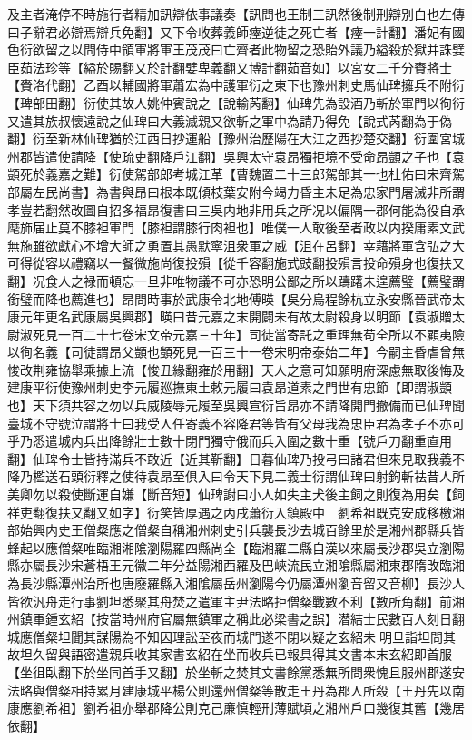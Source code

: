 及主者淹停不時施行者精加訊辯依事議奏【訊問也王制三訊然後制刑辯别白也左傳曰子辭君必辯焉辯兵免翻】又下令收葬義師瘞逆徒之死亡者【瘞一計翻】潘妃有國色衍欲留之以問侍中領軍將軍王茂茂曰亡齊者此物留之恐貽外議乃縊殺於獄并誅嬖臣茹法珍等【縊於賜翻又於計翻嬖卑義翻又博計翻茹音如】以宮女二千分賚將士【賚洛代翻】乙酉以輔國將軍蕭宏為中護軍衍之東下也豫州刺史馬仙琕擁兵不附衍【琕部田翻】衍使其故人姚仲賓說之【說輸芮翻】仙琕先為設酒乃斬於軍門以徇衍又遣其族叔懷遠說之仙琕曰大義滅親又欲斬之軍中為請乃得免【說式芮翻為于偽翻】衍至新林仙琕猶於江西日抄運船【豫州治歷陽在大江之西抄楚交翻】衍圍宮城州郡皆遣使請降【使疏吏翻降戶江翻】吳興太守袁昂獨拒境不受命昂顗之子也【袁顗死於義嘉之難】衍使駕部郎考城江革【曹魏置二十三郎駕部其一也杜佑曰宋齊駕部屬左民尚書】為書與昂曰根本既傾枝葉安附今竭力昏主未足為忠家門屠滅非所謂孝豈若翻然改圖自招多福昂復書曰三吳内地非用兵之所况以偏隅一郡何能為役自承麾斾届止莫不膝袒軍門【膝袒謂膝行肉袒也】唯僕一人敢後至者政以内揆庸素文武無施雖欲獻心不增大師之勇置其愚默寧沮衆軍之威【沮在呂翻】幸藉將軍含弘之大可得從容以禮竊以一餐微施尚復投殞【從千容翻施式豉翻投殞言投命殞身也復扶又翻】况食人之禄而頓忘一旦非唯物議不可亦恐明公鄙之所以躊躇未遑薦璧【薦璧謂銜璧而降也薦進也】昂問時事於武康令北地傅暎【吳分烏程餘杭立永安縣晉武帝太康元年更名武康屬吳興郡】暎曰昔元嘉之末開闢未有故太尉殺身以明節【袁淑贈太尉淑死見一百二十七卷宋文帝元嘉三十年】司徒當寄託之重理無苟全所以不顧夷險以徇名義【司徒謂昂父顗也顗死見一百三十一卷宋明帝泰始二年】今嗣主昏虐曾無悛改荆雍協舉乘據上流【悛丑緣翻雍於用翻】天人之意可知願明府深慮無取後悔及建康平衍使豫州刺史李元履廵撫東土敕元履曰袁昂道素之門世有忠節【即謂淑顗也】天下須共容之勿以兵威陵辱元履至吳興宣衍旨昂亦不請降開門撤備而已仙琕聞臺城不守號泣謂將士曰我受人任寄義不容降君等皆有父母我為忠臣君為孝子不亦可乎乃悉遣城内兵出降餘壯士數十閉門獨守俄而兵入圍之數十重【號戶刀翻重直用翻】仙琕令士皆持滿兵不敢近【近其靳翻】日暮仙琕乃投弓曰諸君但來見取我義不降乃檻送石頭衍釋之使待袁昂至俱入曰令天下見二義士衍謂仙琕曰射鉤斬袪昔人所美卿勿以殺使斷運自嫌【斷音短】仙琕謝曰小人如失主犬後主飼之則復為用矣【飼祥吏翻復扶又翻又如字】衍笑皆厚遇之丙戌蕭衍入鎮殿中　劉希祖既克安成移檄湘部始興内史王僧粲應之僧粲自稱湘州刺史引兵襲長沙去城百餘里於是湘州郡縣兵皆蜂起以應僧粲唯臨湘湘隂瀏陽羅四縣尚全【臨湘羅二縣自漢以來屬長沙郡吳立瀏陽縣亦屬長沙宋蒼梧王元徽二年分益陽湘西羅及巴峽流民立湘隂縣屬湘東郡隋改臨湘為長沙縣潭州治所也唐廢羅縣入湘隂屬岳州瀏陽今仍屬潭州瀏音留又音柳】長沙人皆欲汎舟走行事劉坦悉聚其舟焚之遣軍主尹法略拒僧粲戰數不利【數所角翻】前湘州鎮軍鍾玄紹【按當時州府官屬無鎮軍之稱此必梁書之誤】潜結士民數百人刻日翻城應僧粲坦聞其謀陽為不知因理訟至夜而城門遂不閉以疑之玄紹未明旦詣坦問其故坦久留與語密遣親兵收其家書玄紹在坐而收兵已報具得其文書本末玄紹即首服【坐徂臥翻下於坐同首手又翻】於坐斬之焚其文書餘黨悉無所問衆愧且服州郡遂安法略與僧粲相持累月建康城平楊公則還州僧粲等散走王丹為郡人所殺【王丹先以南康應劉希祖】劉希祖亦舉郡降公則克己亷慎輕刑薄賦頃之湘州戶口幾復其舊【幾居依翻】

